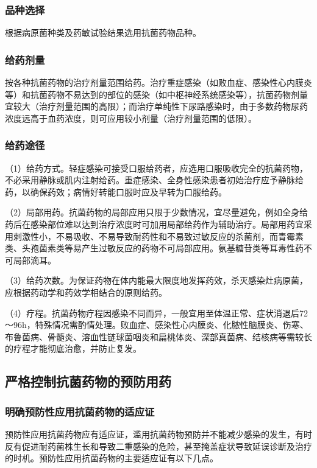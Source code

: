 \subsubsection{品种选择}

根据病原菌种类及药敏试验结果选用抗菌药物品种。

\subsubsection{给药剂量}

按各种抗菌药物的治疗剂量范围给药。治疗重症感染（如败血症、感染性心内膜炎等）和抗菌药物不易达到的部位的感染（如中枢神经系统感染等），抗菌药物剂量宜较大（治疗剂量范围的高限）；而治疗单纯性下尿路感染时，由于多数药物尿药浓度远高于血药浓度，则可应用较小剂量（治疗剂量范围的低限）。

\subsubsection{给药途径}

（1）给药方式。轻症感染可接受口服给药者，应选用口服吸收完全的抗菌药物，不必采用静脉或肌内注射给药。重症感染、全身性感染患者初始治疗应予静脉给药，以确保药效；病情好转能口服时应及早转为口服给药。

（2）局部用药。抗菌药物的局部应用只限于少数情况，宜尽量避免，例如全身给药后在感染部位难以达到治疗浓度时可加用局部给药作为辅助治疗。局部用药宜采用刺激性小，不易吸收、不易导致耐药性和不易致过敏反应的杀菌剂，而青霉素类、头孢菌素类等易产生过敏反应的药物不可局部应用。氨基糖苷类等耳毒性药不可局部滴耳。

（3）给药次数。为保证药物在体内能最大限度地发挥药效，杀灭感染灶病原菌，应根据药动学和药效学相结合的原则给药。

（4）疗程。抗菌药物疗程因感染不同而异，一般宜用至体温正常、症状消退后72～96h，特殊情况需酌情处理。败血症、感染性心内膜炎、化脓性脑膜炎、伤寒、布鲁菌病、骨髓炎、溶血性链球菌咽炎和扁桃体炎、深部真菌病、结核病等需较长的疗程才能彻底治愈，并防止复发。

\subsection{严格控制抗菌药物的预防用药}

\subsubsection{明确预防性应用抗菌药物的适应证}

预防性应用抗菌药物应有适应证，滥用抗菌药物预防并不能减少感染的发生，有时反有促进耐药菌株生长和导致二重感染的危险，甚至掩盖症状导致延误诊断及治疗的时机。预防性应用抗菌药物的主要适应证有以下几点。

